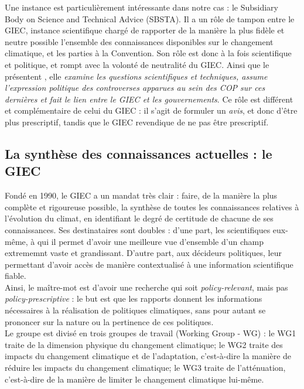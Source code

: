 Une instance est particulièrement intéressante dans notre cas : le Subsidiary Body on Science and Technical Advice (SBSTA). Il a un rôle de tampon entre le GIEC, instance scientifique chargé de rapporter de la manière la plus fidèle et neutre possible l'ensemble des connaissances disponibles sur le changement climatique, et les parties à la Convention. Son rôle est donc à la fois scientifique et politique, et rompt avec la volonté de neutralité du GIEC. Ainsi que le présentent \cite{aykut_gouverner_nodate}, elle \emph{examine les questions scientifiques et techniques, assume l’expression politique des controverses apparues au sein des COP sur ces dernières et fait le lien entre le GIEC et les gouvernements}. Ce rôle est différent et complémentaire de celui du GIEC : il s'agit de formuler un \emph{avis}, et donc d'être plus prescriptif, tandis que le GIEC revendique de ne pas être prescriptif.  \\




\subsection{La synthèse des connaissances actuelles : le GIEC}
\label{sect:1.2.3}

Fondé en 1990, le GIEC a un mandat très clair : faire, de la manière la plus complète et rigoureuse possible, la synthèse de toutes les connaissances relatives à l'évolution du climat, en identifiant le degré de certitude de chacune de ses connaissances. Ses destinataires sont doubles : d'une part, les scientifiques eux-même, à qui il permet d'avoir une meilleure vue d'ensemble d'un champ extrememnt vaste et grandissant. D'autre part, aux décideurs politiques, leur permettant d'avoir accès de manière contextualisé à une information scientifique fiable. \\

Ainsi, le maître-mot est d'avoir une recherche qui soit \emph{policy-relevant}, mais pas \emph{policy-prescriptive} : le but est que les rapports donnent les informations nécessaires à la réalisation de politiques climatiques, sans pour autant se prononcer sur la nature ou la pertinence de ces politiques. \\

Le groupe est divisé en trois groupes de travail (Working Group - WG)  : le WG1 traite de la dimension physique du changement climatique; le WG2 traite des impacts du changement climatique et de l'adaptation, c'est-à-dire la manière de réduire les impacts du changement climatique; le WG3 traite de l'atténuation, c'est-à-dire de la manière de limiter le changement climatique lui-même. 



